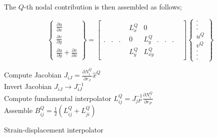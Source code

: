 The $Q$-th nodal contribution is then assembled as follows;


\begin{equation}
\left\{ {\begin{array}{*{20}{c}}
{\frac{{\partial u}}{{\partial x}}}\\
{\frac{{\partial v}}{{\partial y}}}\\
{\frac{{\partial u}}{{\partial y}} + \frac{{\partial v}}{{\partial x}}}
\end{array}} \right\} = \left[ {\begin{array}{*{20}{c}}
.&.&.&{\begin{array}{*{20}{c}}
{L_x^Q}&0\\
0&{L_y^Q}\\
{L_y^Q}&{L_{xy}^Q}
\end{array}}.&.&.&
\end{array}}\right]
\left\{ {\begin{array}{*{20}{c}}
.\\
.\\
.\\
{{u^Q}}\\
{{v^Q}}\\
.\\
.\\
.
\end{array}} \right\}
\label{eq:strain inter}
\end{equation}

\begin{algorithm}[H]
\SetAlgoLined
{}
Compute Jacobian ${J_{iJ}} = \frac{{\partial N_i^Q}}{{\partial {r_J}}}{{\hat x}^Q}$\\
Invert Jacobian  ${J_{iJ}} \to J_{iJ}^{ - 1}$\\
Compute fundamental interpolator $L_{ij}^Q = J_{jP}^{ - 1}\frac{{\partial N_i^Q}}{{\partial {r_P}}}$\\
Assemble $B_{ij}^Q = \frac{1}{2}\left( {L_{ij}^Q + L_{ji}^Q} \right)$ 
\caption{Strain-displacement interpolator}
\end{algorithm}


